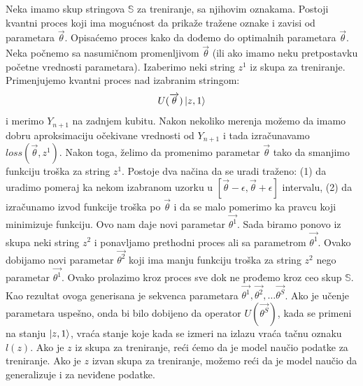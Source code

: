 \documentclass[12pt, letterpaper, oneside]{article}
\begin{document}
Neka imamo skup stringova $\mathbb{S}$ za treniranje, sa njihovim oznakama. Postoji kvantni proces koji ima mogućnost da
prikaže tražene oznake i zavisi od parametara $\overrightarrow{\theta}$. Opisaćemo proces kako da dođemo do optimalnih parametara $\overrightarrow{\theta}$.
Neka počnemo sa nasumičnom promenljivom $\overrightarrow{\theta}$ (ili ako imamo neku pretpostavku početne vrednosti parametara). Izaberimo neki string $z^1$ iz skupa za treniranje.
Primenjujemo kvantni proces nad izabranim stringom:
\[
    U(\overrightarrow{\theta})\Ket{z,1}
\] 
i merimo $Y_{n+1}$ na zadnjem kubitu. Nakon nekoliko merenja možemo da imamo dobru aproksimaciju očekivane vrednosti od $Y_{n+1}$
i tada izračunavamo $\mathit{loss}(\overrightarrow{\theta},z^1)$. Nakon toga, želimo da promenimo parametar $\overrightarrow{\theta}$ tako da smanjimo
funkciju troška za string $z^1$. Postoje dva načina da se uradi traženo: (1) da uradimo pomeraj ka nekom izabranom uzorku u $[\overrightarrow{\theta}-\epsilon,\overrightarrow{\theta}+\epsilon]$ intervalu,
(2) da izračunamo izvod funkcije troška po $\overrightarrow{\theta}$ i da se malo pomerimo ka pravcu koji minimizuje funkciju.
Ovo nam daje novi parametar $\overrightarrow{\theta^1}$. Sada biramo ponovo iz skupa neki string $z^2$ i ponavljamo prethodni proces ali sa parametrom $\overrightarrow{\theta^1}$.
Ovako dobijamo novi parametar $\overrightarrow{\theta^2}$ koji ima manju funkciju troška za string $z^2$ nego parametar $\overrightarrow{\theta^1}$.
Ovako prolazimo kroz proces sve dok ne prođemo kroz ceo skup $\mathbb{S}$. Kao rezultat ovoga generisana je sekvenca parametara $\overrightarrow{\theta^1}, \overrightarrow{\theta^2}, \dots \overrightarrow{\theta^S}$.
Ako je učenje parametara uspešno, onda bi bilo dobijeno da operator $U(\overrightarrow{\theta^S})$, kada se primeni na stanju $\Ket{z,1}$, vraća stanje koje kada se izmeri na izlazu vraća tačnu oznaku $l(z)$.
Ako je $z$ iz skupa za treniranje, reći ćemo da je model naučio podatke za treniranje. Ako je $z$ izvan skupa za treniranje, možemo reći da je model naučio da generalizuje i za neviđene podatke.
\end{document}
